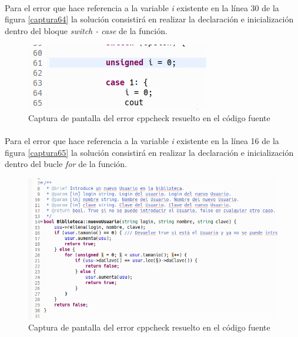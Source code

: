 			\paragraph{}Para el error que hace referencia a la variable \textit{i} existente en la línea 30 de la figura \ref*{captura64} la solución consistirá en realizar la declaración e inicialización dentro del bloque \textit{switch - case} de la función.
			
			\begin{figure}[H]
				\centering
				\includegraphics[scale=0.7]{img/captura72.png}
				\caption{Captura de pantalla del error cppcheck  resuelto en el código fuente}
				\label{captura72}
			\end{figure}
		
			\paragraph{}Para el error que hace referencia a la variable \textit{i} existente en la línea 16 de la figura \ref*{captura65} la solución consistirá en realizar la declaración e inicialización dentro del bucle \textit{for} de la función.
			
			\begin{figure}[H]
				\centering
				\includegraphics[scale=0.6]{img/captura73.png}
				\caption{Captura de pantalla del error cppcheck  resuelto en el código fuente}
				\label{captura73}
			\end{figure}
		

